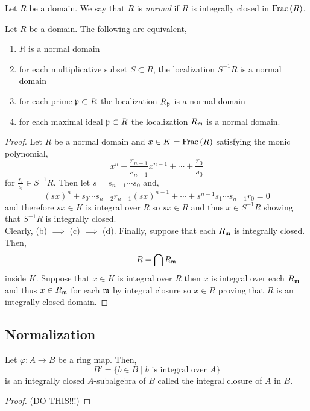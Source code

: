 \documentclass[12pt]{article}
\begin{document}
\begin{defn}
Let $R$ be a domain. We say that $R$ is \textit{normal} if $R$ is integrally closed in $\mathrm{Frac}\left(R\right)$.
\end{defn}

\begin{lemma}
Let $R$ be a domain. The following are equivalent,
\begin{enumerate}
\item $R$ is a normal domain
\item for each multiplicative subset $S \subset R$, the localization $S^{-1} R$ is a normal domain
\item for each prime $\mathfrak{p} \subset R$ the localization $R_{\mathfrak{p}}$ is a normal domain
\item for each maximal ideal $\mathfrak{p} \subset R$ the localization $R_{\mathfrak{m}}$ is a normal domain.
\end{enumerate}
\end{lemma}

\begin{proof}
Let $R$ be a normal domain and $x \in K = \mathrm{Frac}\left(R\right)$ satisfying the monic polynomial,
\[ x^n + \frac{r_{n-1}}{s_{n-1}} x^{n-1} + \cdots + \frac{r_0}{s_0} \]
for $\frac{r_{i}}{s_i} \in S^{-1} R$. Then let $s = s_{n-1} \cdots s_0$ and,
\[ (sx)^n + s_0 \cdots s_{n-2} r_{n-1} (sx)^{n-1} + \cdots + s^{n-1} s_1 \cdots s_{n-1} r_{0} = 0 \]
and therefore $sx \in K$ is integral over $R$ so $sx \in R$ and thus $x \in S^{-1} R$ showing that $S^{-1} R$ is integrally closed.
\bigskip\\
Clearly, (b) $\implies$ (c) $\implies$ (d). Finally, suppose that each $R_{\mathfrak{m}}$ is integrally closed. Then,
\[ R = \bigcap R_{\mathfrak{m}} \]
inside $K$. Suppose that $x \in K$ is integral over $R$ then $x$ is integral over each $R_{\mathfrak{m}}$ and thus $x \in R_{\mathfrak{m}}$ for each $\mathfrak{m}$ by integral closure so $x \in R$ proving that $R$ is an integrally closed domain. 
\end{proof}

\subsection{Normalization}

\begin{lemma}
Let $\varphi : A \to B$ be a ring map. Then,
\[ B' = \{ b \in B \mid b \text{ is integral over } A \} \]
is an integrally closed $A$-subalgebra of $B$ called the integral closure of $A$ in $B$.
\end{lemma}

\begin{proof}
(DO THIS!!!)
\end{proof}
\end{document}
